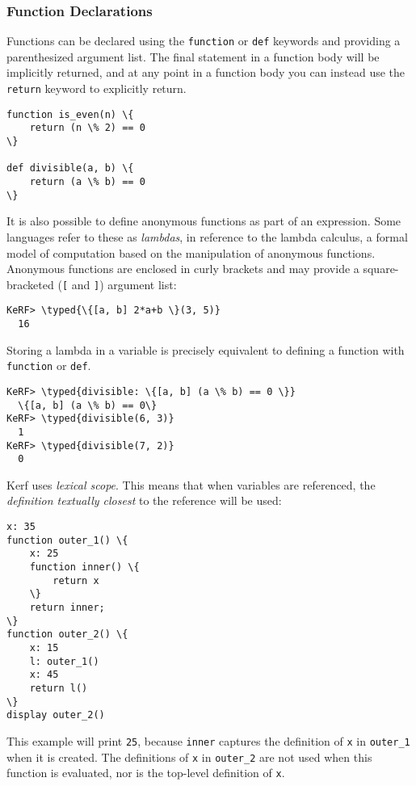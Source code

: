 \documentclass{article}
\newcommand{\typed}[1]{\textcolor{TealBlue}{#1}}
\begin{document}
\subsubsection{Function Declarations}
Functions can be declared using the \texttt{function} or \texttt{def} keywords and providing a parenthesized argument list. The final statement in a function body will be implicitly returned, and at any point in a function body you can instead use the \texttt{return} keyword to explicitly return.
\begin{Verbatim}
function is_even(n) \{
	return (n \% 2) == 0
\}

def divisible(a, b) \{
	return (a \% b) == 0
\}
\end{Verbatim}

\vspace{0.5cm}

It is also possible to define anonymous functions as part of an expression. Some languages refer to these as \emph{lambdas}, in reference to the lambda calculus, a formal model of computation based on the manipulation of anonymous functions. Anonymous functions are enclosed in curly brackets and may provide a square-bracketed (\texttt{[} and \texttt{]}) argument list:
\begin{Verbatim}
KeRF> \typed{\{[a, b] 2*a+b \}(3, 5)}
  16
\end{Verbatim}

Storing a lambda in a variable is precisely equivalent to defining a function with \texttt{function} or \texttt{def}.
\begin{Verbatim}
KeRF> \typed{divisible: \{[a, b] (a \% b) == 0 \}}
  \{[a, b] (a \% b) == 0\}
KeRF> \typed{divisible(6, 3)}
  1
KeRF> \typed{divisible(7, 2)}
  0
\end{Verbatim}

\vspace{0.5cm}

Kerf uses \emph{lexical scope}. This means that when variables are referenced, the \emph{definition textually closest} to the reference will be used:
\begin{Verbatim}
x: 35
function outer_1() \{
	x: 25
	function inner() \{
		return x
	\}
	return inner;
\}
function outer_2() \{
	x: 15
	l: outer_1()
	x: 45
	return l()
\}
display outer_2()
\end{Verbatim}
This example will print \texttt{25}, because \texttt{inner} captures the definition of \texttt{x} in \texttt{outer\_1} when it is created. The definitions of \texttt{x} in \texttt{outer\_2} are not used when this function is evaluated, nor is the top-level definition of \texttt{x}.
\end{document}
